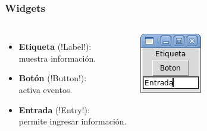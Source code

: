 \documentclass[12pt]{beamer}
\begin{document}
  \begin{frame}
    \label{widgets}
    \frametitle{Widgets}
    \begin{columns}
        \begin{itemize}
          \item \textbf{Etiqueta} (\li!Label!): \\ muestra información.
          \item \textbf{Botón} (\li!Button!):   \\ activa eventos.
          \item \textbf{Entrada} (\li!Entry!): \\ permite ingresar información.
        \end{itemize}
        \includegraphics[width=\textwidth]{programas/tkinter/capturas/widgets.png}
    \end{columns}
  \end{frame}
\end{document}
